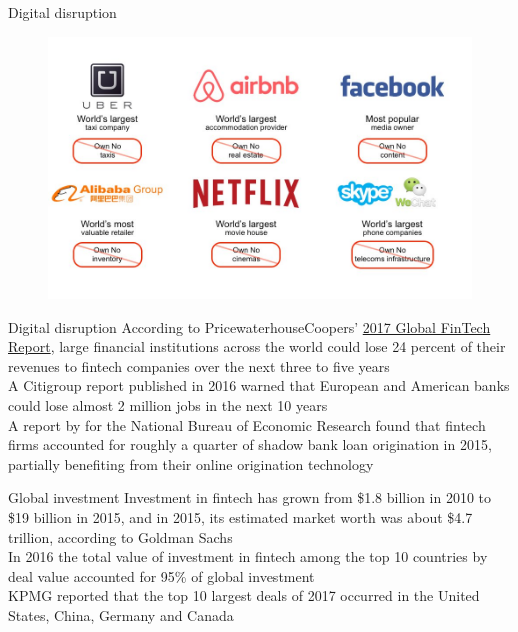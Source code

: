 \documentclass[9pt]{beamer}
\begin{document}

\begin{frame}{Digital disruption}
	\begin{figure}[]
		\centering
		\includegraphics  [scale=0.3]{Images/disruption}
	\end{figure}
\end{frame}


\begin{frame}{Digital disruption}
	According to PricewaterhouseCoopers' \href{http://www.pwc.com/ee/et/publications/pub/pwc-global-fintech-report-2017.pdf}{2017 Global FinTech Report}, large financial institutions across the world could lose 24 percent of their revenues to fintech companies over the next three to five years\\ \vspace{3mm}
	A Citigroup report published in 2016 warned that European and American banks could lose almost 2 million jobs in the next 10 years \\ \vspace{3mm}
	A report by \cite{buchak2017} for the National Bureau of Economic Research found that fintech firms accounted for roughly a quarter of shadow bank loan origination in 2015, partially benefiting from their online origination technology \\ \vspace{3mm}
\end{frame}


\begin{frame}{Global investment}
	Investment in fintech has grown from \$1.8 billion in 2010 to \$19 billion in 2015, and in 2015, its estimated market worth was about \$4.7 trillion, according to Goldman Sachs \\ \vspace{3mm}
	In 2016 the total value of investment in fintech among the top 10 countries by deal value accounted for 95\% of global investment \\ \vspace{3mm}
	KPMG reported that the top 10 largest deals of 2017 occurred in the United States, China, Germany and Canada
\end{frame}
\end{document}
